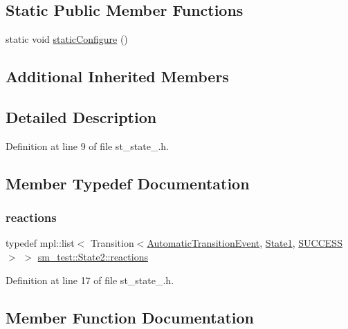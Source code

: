 \subsection*{Static Public Member Functions}
\begin{DoxyCompactItemize}
\item 
static void \hyperlink{structsm__test_1_1State2_ae346e36b141b813f7975293ce9dceb03}{static\+Configure} ()
\end{DoxyCompactItemize}
\subsection*{Additional Inherited Members}


\subsection{Detailed Description}


Definition at line 9 of file st\+\_\+state\+\_.\+h.



\subsection{Member Typedef Documentation}
\mbox{\label{structsm__test_1_1State2_afd502acd32533d128e63707ecf8baa61}} 
\subsubsection{\texorpdfstring{reactions}{reactions}}
{\footnotesize\ttfamily typedef mpl\+::list$<$ Transition$<$\hyperlink{structsm__test_1_1AutomaticTransitionEvent}{Automatic\+Transition\+Event}, \hyperlink{structsm__test_1_1State1}{State1}, \hyperlink{classSUCCESS}{S\+U\+C\+C\+E\+SS}$>$ $>$ \hyperlink{structsm__test_1_1State2_afd502acd32533d128e63707ecf8baa61}{sm\+\_\+test\+::\+State2\+::reactions}}



Definition at line 17 of file st\+\_\+state\+\_.\+h.



\subsection{Member Function Documentation}
\mbox{\label{structsm__test_1_1State2_aa817bd1d4b9325967ae0a8b93bcf9f70}} 
